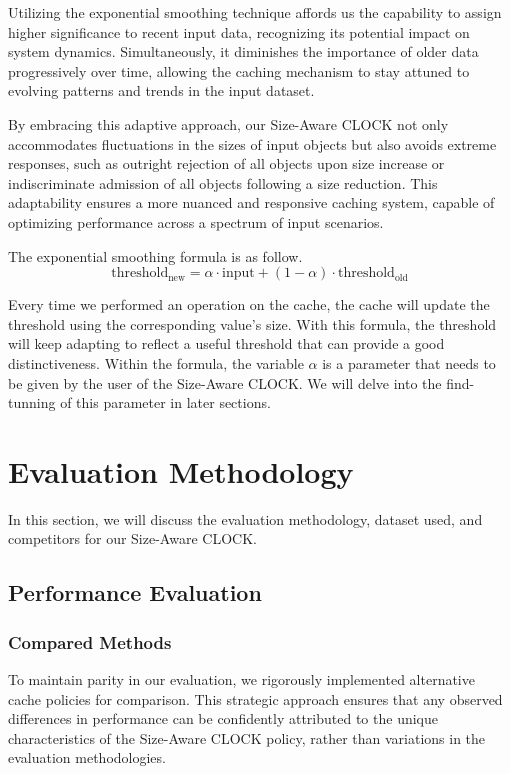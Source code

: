 \documentclass[conference]{IEEEtran}
\begin{document}
Utilizing the exponential smoothing technique affords us the capability to assign higher significance to recent input data, recognizing its potential impact on system dynamics. Simultaneously, it diminishes the importance of older data progressively over time, allowing the caching mechanism to stay attuned to evolving patterns and trends in the input dataset.

By embracing this adaptive approach, our Size-Aware CLOCK not only accommodates fluctuations in the sizes of input objects but also avoids extreme responses, such as outright rejection of all objects upon size increase or indiscriminate admission of all objects following a size reduction. This adaptability ensures a more nuanced and responsive caching system, capable of optimizing performance across a spectrum of input scenarios. 

The exponential smoothing formula is as follow.
\[
\text{threshold}_{\text{new}} = \alpha \cdot \text{input} + (1 - \alpha) \cdot \text{threshold}_{\text{old}}
\]

Every time we performed an operation on the cache, the cache will update the threshold using the corresponding value's size. With this formula, the threshold will keep adapting to reflect a useful threshold that can provide a good distinctiveness.
Within the formula, the variable $\alpha$ is a parameter that needs to be given by the user of the Size-Aware CLOCK. We will delve into the find-tunning of this parameter in later sections.


\section{Evaluation Methodology}
In this section, we will discuss the evaluation methodology, dataset used, and competitors for our Size-Aware CLOCK.

\subsection{Performance Evaluation}
\subsubsection{Compared Methods}
To maintain parity in our evaluation, we rigorously implemented alternative cache policies for comparison. This strategic approach ensures that any observed differences in performance can be confidently attributed to the unique characteristics of the Size-Aware CLOCK policy, rather than variations in the evaluation methodologies.
\end{document}
